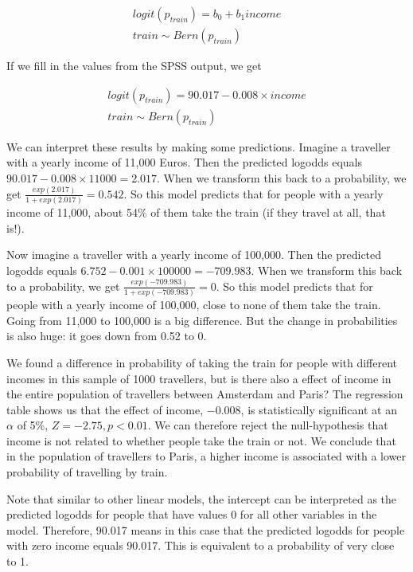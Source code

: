 \documentclass[]{book}\usepackage[]{graphicx}\usepackage[]{color}
\begin{document}
\begin{eqnarray}
logit(p_{train}) = b_0 + b_1 income \nonumber \\
train \sim Bern(p_{train})
\end{eqnarray}

If we fill in the values from the SPSS output, we get


\begin{eqnarray}
logit(p_{train}) = 90.017 - 0.008 \times income \nonumber \\
train \sim Bern(p_{train})
\end{eqnarray}


We can interpret these results by making some predictions. Imagine a traveller with a yearly income of 11,000 Euros. Then the predicted logodds equals $90.017 - 0.008 \times 11000= 2.017$. When we transform this back to a probability, we get $\frac{exp(2.017) } {1+ exp(2.017) }= 0.542  $. So this model predicts that for people with a yearly income of 11,000, about 54\% of them take the train (if they travel at all, that is!).

Now imagine a traveller with a yearly income of 100,000. Then the predicted logodds equals $6.752 - 0.001 \times 100000= -709.983$. When we transform this back to a probability, we get $\frac{exp(-709.983) } {1+ exp(-709.983) }= 0$. So this model predicts that for people with a yearly income of 100,000, close to none of them take the train.
Going from 11,000 to 100,000 is a big difference. But the change in probabilities is also huge: it goes down from 0.52 to 0.

We found a difference in probability of taking the train for people with different incomes in this sample of 1000 travellers, but is there also a effect of income in the entire population of travellers between Amsterdam and Paris? The regression table shows us that the effect of income, $- 0.008$, is statistically significant at an $\alpha$ of 5\%, $Z=-2.75, p<0.01$. We can therefore reject the null-hypothesis that income is not related to whether people take the train or not. We conclude that in the population of travellers to Paris, a higher income is associated with a lower probability of travelling by train.

Note that similar to other linear models, the intercept can be interpreted as the predicted logodds for people that have values 0 for all other variables in the model. Therefore, 90.017 means in this case that the predicted logodds for people with zero income equals 90.017. This is equivalent to a probability of very close to 1.
\end{document}
